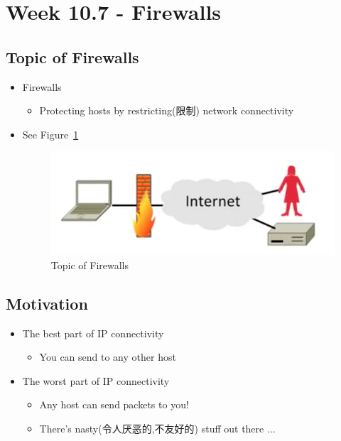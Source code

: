 \documentclass[12pt]{ctexart}   %
\begin{document}
\section{Week 10.7 - Firewalls}
	\subsection{Topic of Firewalls}
	\begin{itemize}
		\item Firewalls
		\begin{itemize}
			\item Protecting hosts by restricting(限制) network connectivity
		\end{itemize}
		\item See Figure~\ref{fig:10-7-1}
		  
		\begin{figure}[h!] %
		\centering
		\includegraphics[scale=0.7]{images/10-7-1}
		\caption{Topic of Firewalls}
		\label{fig:10-7-1}
		\end{figure}
	\end{itemize}

	\subsection{Motivation}
	\begin{itemize}
		\item The best part of IP connectivity
		\begin{itemize}
			\item You can send to any other host
		\end{itemize}

		\item The worst part of IP connectivity
		\begin{itemize}
			\item Any host can send packets to you!
			\item There's nasty(令人厌恶的,不友好的) stuff out there ...
		\end{itemize}
	\end{itemize}
\end{document}
